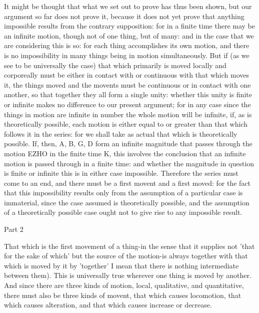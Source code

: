 It might be thought that what we set out to prove has thus been shown,
but our argument so far does not prove it, because it does not yet
prove that anything impossible results from the contrary supposition:
for in a finite time there may be an infinite motion, though not of
one thing, but of many: and in the case that we are considering this
is so: for each thing accomplishes its own motion, and there is no
impossibility in many things being in motion simultaneously. But if
(as we see to be universally the case) that which primarily is moved
locally and corporeally must be either in contact with or continuous
with that which moves it, the things moved and the movents must be
continuous or in contact with one another, so that together they all
form a single unity: whether this unity is finite or infinite makes
no difference to our present argument; for in any case since the things
in motion are infinite in number the whole motion will be infinite,
if, as is theoretically possible, each motion is either equal to or
greater than that which follows it in the series: for we shall take
as actual that which is theoretically possible. If, then, A, B, G,
D form an infinite magnitude that passes through the motion EZHO in
the finite time K, this involves the conclusion that an infinite motion
is passed through in a finite time: and whether the magnitude in question
is finite or infinite this is in either case impossible. Therefore
the series must come to an end, and there must be a first movent and
a first moved: for the fact that this impossibility results only from
the assumption of a particular case is immaterial, since the case
assumed is theoretically possible, and the assumption of a theoretically
possible case ought not to give rise to any impossible result.

Part 2

That which is the first movement of a thing-in the sense that it supplies
not 'that for the sake of which' but the source of the motion-is always
together with that which is moved by it by 'together' I mean that
there is nothing intermediate between them). This is universally true
wherever one thing is moved by another. And since there are three
kinds of motion, local, qualitative, and quantitative, there must
also be three kinds of movent, that which causes locomotion, that
which causes alteration, and that which causes increase or decrease.

